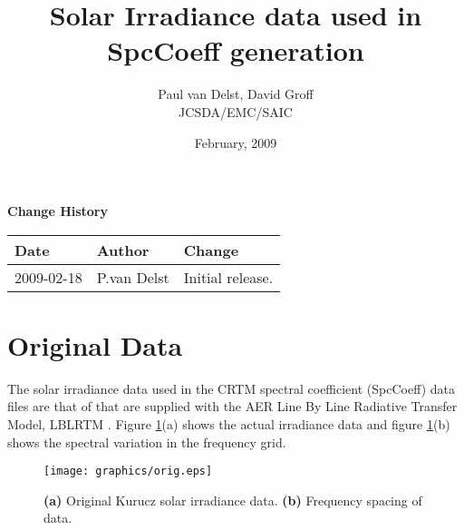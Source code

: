 


%

\title{Solar Irradiance data used in SpcCoeff generation}
\author{Paul van Delst, David Groff\\JCSDA/EMC/SAIC}
\date{February, 2009}



\maketitle


\thispagestyle{empty}
\vspace*{10cm}
\begin{center}
  {\sffamily\Large\bfseries Change History}
  \begin{table}[htp]
    \centering
    \begin{tabular}{|p{2cm}|p{3cm}|p{8cm}|}
      \hline
      \sffamily\textbf{Date} & \sffamily\textbf{Author} & \sffamily\textbf{Change}\\
      \hline\hline
      2009-02-18 & P.van Delst & Initial release.\\
      \hline
    \end{tabular}
  \end{table}
\end{center}
\clearpage
{}
\setcounter{page}{1}


%

\section{Original Data}
The solar irradiance data used in the CRTM spectral coefficient (SpcCoeff) data files are that of  \citet{Kurucz1992} that are supplied with the AER Line By Line Radiative Transfer Model, LBLRTM \citep{Clough_etal_2005}. Figure \ref{fig:Kurucz_orig}(a) shows the actual irradiance data and figure \ref{fig:Kurucz_orig}(b) shows the spectral variation in the frequency grid.

\begin{figure}[htp]
  \centering
  \texttt{[image: graphics/orig.eps]}
  \caption{\textbf{(a)} Original Kurucz solar irradiance data. \textbf{(b)} Frequency spacing of data.}
  \label{fig:Kurucz_orig}
\end{figure}

